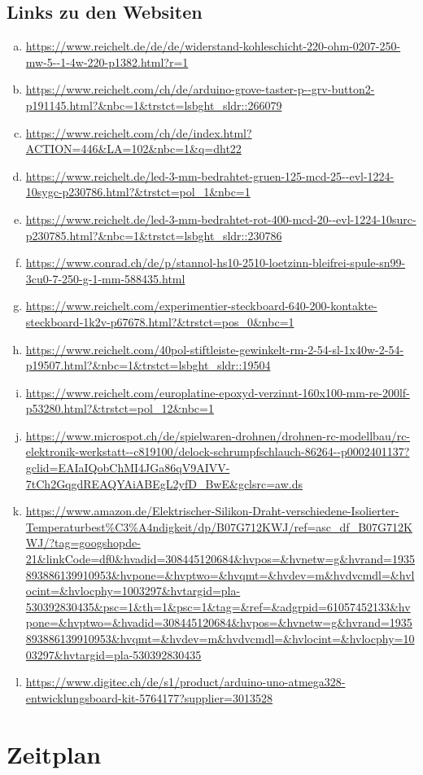 \documentclass{paper}
\begin{document}
\subsection*{Links zu den Websiten}
\begin{enumerate}[(a)]
\item \url{https://www.reichelt.de/de/de/widerstand-kohleschicht-220-ohm-0207-250-mw-5--1-4w-220-p1382.html?r=1}
\item \url{https://www.reichelt.com/ch/de/arduino-grove-taster-p--grv-button2-p191145.html?&nbc=1&trstct=lsbght_sldr::266079}
\item \url{https://www.reichelt.com/ch/de/index.html?ACTION=446&LA=102&nbc=1&q=dht22}
\item \url{https://www.reichelt.de/led-3-mm-bedrahtet-gruen-125-mcd-25--evl-1224-10sygc-p230786.html?&trstct=pol_1&nbc=1}
\item \url{https://www.reichelt.de/led-3-mm-bedrahtet-rot-400-mcd-20--evl-1224-10surc-p230785.html?&nbc=1&trstct=lsbght_sldr::230786}
\item \url{https://www.conrad.ch/de/p/stannol-hs10-2510-loetzinn-bleifrei-spule-sn99-3cu0-7-250-g-1-mm-588435.html}
\item \url{https://www.reichelt.com/experimentier-steckboard-640-200-kontakte-steckboard-1k2v-p67678.html?&trstct=pos_0&nbc=1}
\item \url{https://www.reichelt.com/40pol-stiftleiste-gewinkelt-rm-2-54-sl-1x40w-2-54-p19507.html?&nbc=1&trstct=lsbght_sldr::19504}
\item \url{https://www.reichelt.com/europlatine-epoxyd-verzinnt-160x100-mm-re-200lf-p53280.html?&trstct=pol_12&nbc=1}
\item \url{https://www.microspot.ch/de/spielwaren-drohnen/drohnen-rc-modellbau/rc-elektronik-werkstatt--c819100/delock-schrumpfschlauch-86264--p0002401137?gclid=EAIaIQobChMI4JGa86qV9AIVV-7tCh2GqgdREAQYAiABEgL2yfD_BwE&gclsrc=aw.ds}
\item \url{https://www.amazon.de/Elektrischer-Silikon-Draht-verschiedene-Isolierter-Temperaturbest%C3%A4ndigkeit/dp/B07G712KWJ/ref=asc_df_B07G712KWJ/?tag=googshopde-21&linkCode=df0&hvadid=308445120684&hvpos=&hvnetw=g&hvrand=1935893886139910953&hvpone=&hvptwo=&hvqmt=&hvdev=m&hvdvcmdl=&hvlocint=&hvlocphy=1003297&hvtargid=pla-530392830435&psc=1&th=1&psc=1&tag=&ref=&adgrpid=61057452133&hvpone=&hvptwo=&hvadid=308445120684&hvpos=&hvnetw=g&hvrand=1935893886139910953&hvqmt=&hvdev=m&hvdvcmdl=&hvlocint=&hvlocphy=1003297&hvtargid=pla-530392830435}
\item \url{https://www.digitec.ch/de/s1/product/arduino-uno-atmega328-entwicklungsboard-kit-5764177?supplier=3013528}
\end{enumerate}
\newpage
\section*{Zeitplan}

\end{document}
